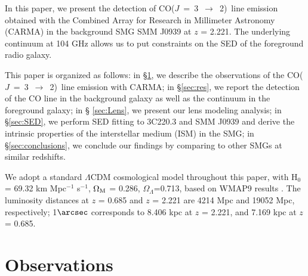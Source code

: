 \documentclass[twocolumn,apj,numberedappendix]{emulateapj}
\newcommand{\CO}{\mbox{CO($J$ = 3 $\rightarrow$ 2) }}
\newcommand{\pmOne}{$^{-1}$}
\begin{document}
In this paper, we present the detection of \CO line emission obtained with the Combined
Array for Research in Millimeter Astronomy (CARMA) in the background SMG
SMM J0939 at $z$ = 2.221. The underlying continuum at 104 GHz allows us to put constraints on the SED of the 
foreground radio galaxy. 

This paper is organized as follows: in \S \ref{sec:obs}, we describe the
observations of the \CO line emission with CARMA; in \S \ref{sec:res}, we report the
detection of the CO line in the background galaxy as well as the continuum in the foreground galaxy; in \S
\ref{sec:Lens}, we present our lens modeling analysis; in \S \ref{sec:SED}, we perform SED fitting to 3C220.3
and SMM J0939 and derive the intrinsic properties of the interstellar medium (ISM) in the SMG; in \S \ref{sec:conclusions}, we
conclude our findings by comparing to other SMGs at similar redshifts.

We adopt a standard $\Lambda$CDM cosmological model throughout this paper, with H$_0$= 69.32 km Mpc\pmOne
s\pmOne, $\Omega_{\rm M}$ = 0.286, $\Omega_\Lambda$=0.713, based on WMAP9 results \citep{Hinshaw13a}.
The luminosity distances at $z$ = 0.685 and $z$ = 2.221 are 4214 Mpc and 19052 Mpc, respectively; 1$\arcsec$
corresponds to 8.406 kpc at $z$ = 2.221, and 7.169 kpc at $z$ = 0.685.

\section{Observations}\label{sec:obs}
\end{document}
